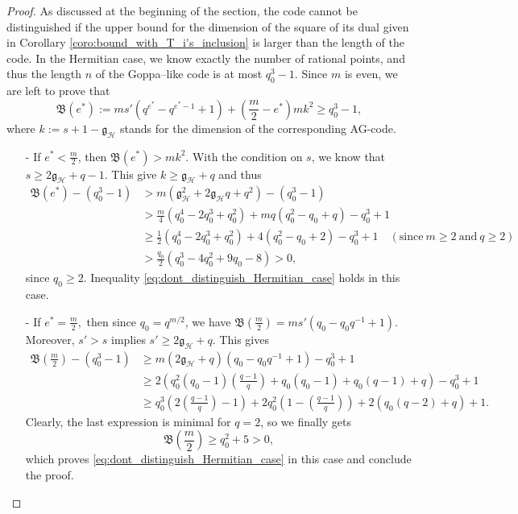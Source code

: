 \documentclass[a4paper]{article}
\theoremstyle{definition}
\theoremstyle{remark}
\newcommand{\calH}{\mathcal{H}}
\begin{document}
\begin{proof}
    As discussed at the beginning of the section, the code cannot be distinguished if the upper bound for the dimension of the square of its dual given in Corollary \ref{coro:bound_with_T_i's_inclusion} is larger than the length of the code. In the Hermitian case, we know exactly the number of rational points, and thus the length $n$ of the Goppa--like code is at most $q_0^3-1$. Since $m$ is even, we are left to prove that 
    \begin{equation} \label{eq:dont_distinguish_Hermitian_case}
    \mathfrak{B}(e^*) := ms'(q^{e^*}-q^{e^*-1}+1) + \left( \frac{m}{2}-e^*\right)mk^2 \geq q_0^3-1,
    \end{equation}
    where $k := s+1-\mathfrak{g}_{\calH}$ stands  for the dimension of the corresponding AG-code.
    \begin{itemize}
        \item [-] If $e^* < \frac{m}{2}$, then $\mathfrak{B}(e^*) > mk^2$. With the condition on $s$, we know that $s \geq 2\mathfrak{g}_{\calH}+q-1$. This give $k \geq \mathfrak{g}_{\calH}+q$ and thus
        \begin{align*}
\mathfrak{B}(e^*) - (q_0^3-1) 
&> m(\mathfrak{g}_{\calH}^2+2\mathfrak{g}_{\calH}q+q^2)-(q_0^3-1)\\
& > \frac{m}{4}(q_0^4-2q_0^3+q_0^2) + mq(q_0^2-q_0+q) -q_0^3+1 \\
& \geq \frac{1}{2}(q_0^4-2q_0^3+q_0^2)+4(q_0^2-q_0+2)-q_0^3+1 \quad (\mathrm{since} \ m\geq 2 \ \mathrm{and} \ q\geq 2)\\
& > \frac{q_0}{2} (q_0^3-4q_0^2+9q_0-8) > 0,
        \end{align*}
        since $q_0 \geq 2$. Inequality \eqref{eq:dont_distinguish_Hermitian_case} holds in this case.
        \item[-] If $e^* = \frac{m}{2},$ then since $q_0=q^{m/2}$, we have $\mathfrak{B}\left(\frac{m}{2}\right) = ms'(q_0-q_0q^{-1}+1)$. Moreover, $s'>s$ implies $s' \geq 2\mathfrak{g}_{\calH}+q$. This gives
        \begin{align*}
           \mathfrak{B}\left(\frac{m}{2}\right) - (q_0^3-1) 
           &\geq m(2\mathfrak{g}_{\calH}+q)(q_0-q_0q^{-1}+1)-q_0^3+1 \\ 
           &\geq 2\left(q_0^2(q_0-1)\left(\frac{q-1}{q}\right)+q_0(q_0-1)+q_0(q-1)+q\right)-q_0^3+1 \\
           & \geq q_0^3\left(2\left(\frac{q-1}{q}\right)-1\right) + 2q_0^2\left(1-\left(\frac{q-1}{q}\right)\right) + 2(q_0(q-2)+q)+1.
        \end{align*}
        Clearly, the last expression is minimal for $q=2$, so we finally gets
        $$\mathfrak{B}\left(\frac{m}{2}\right) \geq q_0^2 + 5 >0,$$
        which proves \eqref{eq:dont_distinguish_Hermitian_case} in this case and conclude the proof.
    \end{itemize}
\end{proof}
\end{document}
